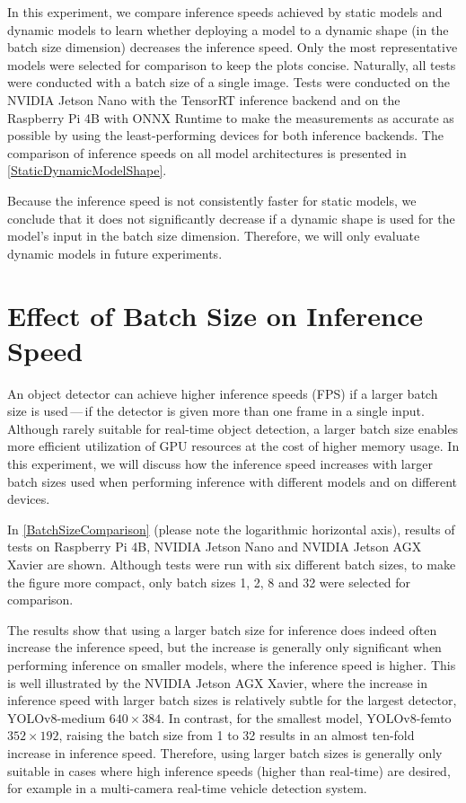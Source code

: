 In this experiment, we compare inference speeds achieved by static models and
dynamic models to learn whether deploying a model to a dynamic shape (in the
batch size dimension) decreases the inference speed. Only the most
representative models were selected for comparison to keep the plots concise.
Naturally, all tests were conducted with a batch size of a single image. Tests
were conducted on the NVIDIA Jetson Nano with the TensorRT inference backend and
on the Raspberry Pi 4B with ONNX Runtime to make the measurements as accurate as
possible by using the least-performing devices for both inference backends. The
comparison of inference speeds on all model architectures is presented in
\autoref{StaticDynamicModelShape}.

Because the inference speed is not consistently faster for static models, we
conclude that it does not significantly decrease if a dynamic shape is used for
the model's input in the batch size dimension. Therefore, we will only evaluate
dynamic models in future experiments.








\section{Effect of Batch Size on Inference Speed}
\label{BatchSizeComparisonSection}

An object detector can achieve higher inference speeds (FPS) if a larger batch
size is used\,---\,if the detector is given more than one frame in a single
input. Although rarely suitable for real-time object detection, a larger batch
size enables more efficient utilization of GPU resources at the cost of higher
memory usage. In this experiment, we will discuss how the inference speed
increases with larger batch sizes used when performing inference with different
models and on different devices.

In \autoref{BatchSizeComparison} (please note the logarithmic horizontal axis),
results of tests on Raspberry Pi 4B, NVIDIA Jetson Nano and NVIDIA Jetson AGX
Xavier are shown. Although tests were run with six different batch sizes, to
make the figure more compact, only batch sizes 1, 2, 8 and 32 were selected for
comparison.

The results show that using a larger batch size for inference does indeed often
increase the inference speed, but the increase is generally only significant
when performing inference on smaller models, where the inference speed is
higher. This is well illustrated by the NVIDIA Jetson AGX Xavier, where the
increase in inference speed with larger batch sizes is relatively subtle for the
largest detector, YOLOv8-medium $640 \times 384$. In contrast, for the smallest
model, YOLOv8-femto $352 \times 192$, raising the batch size from 1 to 32
results in an almost ten-fold increase in inference speed. Therefore, using
larger batch sizes is generally only suitable in cases where high inference
speeds (higher than real-time) are desired, for example in a multi-camera
real-time vehicle detection system.

